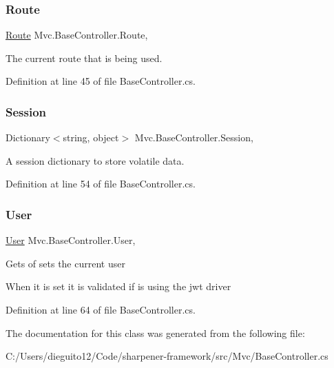 \subsubsection{\texorpdfstring{Route}{Route}}
{\footnotesize\ttfamily \hyperlink{class_mvc_1_1_route}{Route} Mvc.\+Base\+Controller.\+Route\hspace{0.3cm}{\ttfamily [get]}, {\ttfamily [set]}}



The current route that is being used. 



Definition at line 45 of file Base\+Controller.\+cs.

\mbox{\label{class_mvc_1_1_base_controller_ac9ec764bde3833c4da076a64b0f3d0cc}} 
\subsubsection{\texorpdfstring{Session}{Session}}
{\footnotesize\ttfamily Dictionary$<$string, object$>$ Mvc.\+Base\+Controller.\+Session\hspace{0.3cm}{\ttfamily [get]}, {\ttfamily [set]}}



A session dictionary to store volatile data. 



Definition at line 54 of file Base\+Controller.\+cs.

\mbox{\label{class_mvc_1_1_base_controller_a441230929ad77f983c662d419474c41a}} 
\subsubsection{\texorpdfstring{User}{User}}
{\footnotesize\ttfamily \hyperlink{class_mvc_1_1_user}{User} Mvc.\+Base\+Controller.\+User\hspace{0.3cm}{\ttfamily [get]}, {\ttfamily [set]}}



Gets of sets the current user 

When it is set it is validated if is using the jwt driver

Definition at line 64 of file Base\+Controller.\+cs.



The documentation for this class was generated from the following file\+:\begin{DoxyCompactItemize}
\item 
C\+:/\+Users/dieguito12/\+Code/sharpener-\/framework/src/\+Mvc/Base\+Controller.\+cs\end{DoxyCompactItemize}
